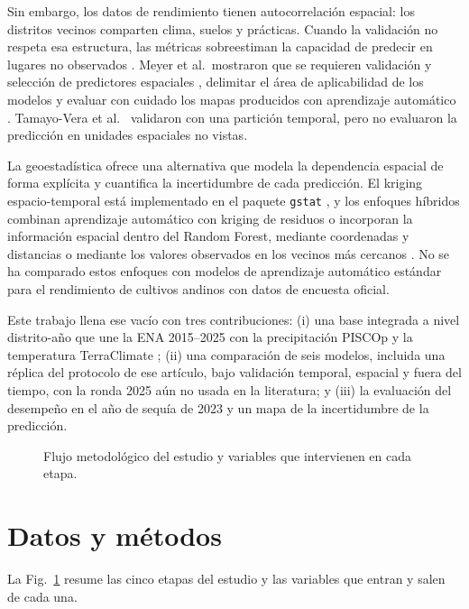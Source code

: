 \documentclass[conference,letterpaper]{IEEEtran}
\begin{document}
Sin embargo, los datos de rendimiento tienen autocorrelación espacial: los distritos vecinos comparten clima, suelos y prácticas. Cuando la validación no respeta esa estructura, las métricas sobreestiman la capacidad de predecir en lugares no observados \cite{roberts2017,ploton2020}. Meyer et al.\ mostraron que se requieren validación y selección de predictores espaciales \cite{meyer2019}, delimitar el área de aplicabilidad de los modelos \cite{meyer2021} y evaluar con cuidado los mapas producidos con aprendizaje automático \cite{meyer2022}. Tamayo-Vera et al.\ \cite{tamayovera2025} validaron con una partición temporal, pero no evaluaron la predicción en unidades espaciales no vistas.

La geoestadística ofrece una alternativa que modela la dependencia espacial de forma explícita y cuantifica la incertidumbre de cada predicción. El kriging espacio-temporal está implementado en el paquete \texttt{gstat} \cite{graler2016}, y los enfoques híbridos combinan aprendizaje automático con kriging de residuos \cite{sensors2022} o incorporan la información espacial dentro del Random Forest, mediante coordenadas y distancias \cite{hengl2018} o mediante los valores observados en los vecinos más cercanos \cite{sekulic2020}. No se ha comparado estos enfoques con modelos de aprendizaje automático estándar para el rendimiento de cultivos andinos con datos de encuesta oficial.

Este trabajo llena ese vacío con tres contribuciones: (i) una base integrada a nivel distrito-año que une la ENA 2015--2025 \cite{inei_ena} con la precipitación PISCOp \cite{aybar2020} y la temperatura TerraClimate \cite{abatzoglou2018}; (ii) una comparación de seis modelos, incluida una réplica del protocolo de ese artículo, bajo validación temporal, espacial y fuera del tiempo, con la ronda 2025 aún no usada en la literatura; y (iii) la evaluación del desempeño en el año de sequía de 2023 y un mapa de la incertidumbre de la predicción.

\begin{figure}[!t]
\centering

\caption{Flujo metodológico del estudio y variables que intervienen en cada etapa.}
\label{fig:flujo}
\end{figure}

\section{Datos y métodos}
La Fig.~\ref{fig:flujo} resume las cinco etapas del estudio y las variables que entran y salen de cada una.
\end{document}
